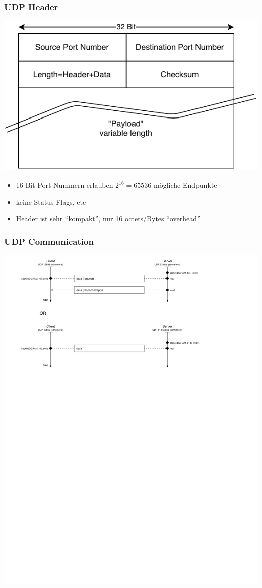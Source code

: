 \documentclass[ignorenonframetext]{beamer}
\begin{document}
\begin{frame}
\frametitle{UDP Header}
\includegraphics{udp-header}
\begin{itemize}
  \item 16 Bit Port Nummern erlauben $2^{16}=65536$ m\"ogliche Endpunkte
  \item keine Status-Flags, etc
  \item Header ist sehr ``kompakt'', nur 16 octets/Bytes ``overhead''
\end{itemize}
\end{frame}

\begin{frame}
\frametitle{UDP Communication}
\includegraphics[width=15cm]{udp-communication}
\end{frame}
\end{document}

